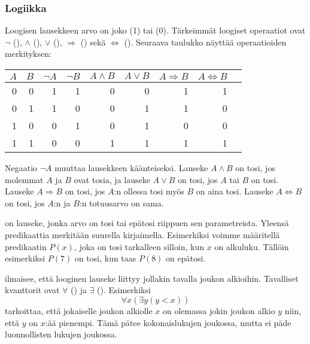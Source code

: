 \subsubsection{Logiikka}


Loogisen lausekkeen arvo on joko  (1) tai
 (0).
Tärkeimmät loogiset operaatiot ovat
$\lnot$ (),
$\land$ (),
$\lor$ (),
$\Rightarrow$ () sekä
$\Leftrightarrow$ ().
Seuraava taulukko näyttää operaatioiden merkityksen:

\begin{center}
\begin{tabular}{rr|rrrrrrr}
$A$ & $B$ & $\lnot A$ & $\lnot B$ & $A \land B$ & $A \lor B$ & $A \Rightarrow B$ & $A \Leftrightarrow B$ \\
\hline
0 & 0 & 1 & 1 & 0 & 0 & 1 & 1 \\
0 & 1 & 1 & 0 & 0 & 1 & 1 & 0 \\
1 & 0 & 0 & 1 & 0 & 1 & 0 & 0 \\
1 & 1 & 0 & 0 & 1 & 1 & 1 & 1 \\
\end{tabular}
\end{center}

Negaatio $\lnot A$ muuttaa lausekkeen käänteiseksi.
Lauseke $A \land B$ on tosi, jos molemmat $A$ ja $B$ ovat tosia,
ja lauseke $A \lor B$ on tosi, jos $A$ tai $B$ on tosi.
Lauseke $A \Rightarrow B$ on tosi,
jos $A$:n ollessa tosi myös $B$ on aina tosi.
Lauseke $A \Leftrightarrow B$ on tosi,
jos $A$:n ja $B$:n totuusarvo on sama.


 on lauseke, jonka arvo on tosi tai epätosi
riippuen sen parametreista.
Yleensä predikaattia merkitään suurella kirjaimella.
Esimerkiksi voimme määritellä predikaatin $P(x)$,
joka on tosi tarkalleen silloin, kun $x$ on alkuluku.
Tällöin esimerkiksi $P(7)$ on tosi, kun taas $P(8)$ on epätosi.


 ilmaisee, että looginen
lauseke liittyy jollakin tavalla joukon alkioihin.
Tavalliset kvanttorit
ovat $\forall$ () ja $\exists$ ().
Esimerkiksi
\[\forall x (\exists y (y < x))\]
tarkoittaa, että jokaiselle joukon
alkiolle $x$ on olemassa
jokin joukon alkio $y$ niin, että $y$ on $x$:ää pienempi.
Tämä pätee kokonaislukujen joukossa,
mutta ei päde luonnollisten lukujen joukossa.

